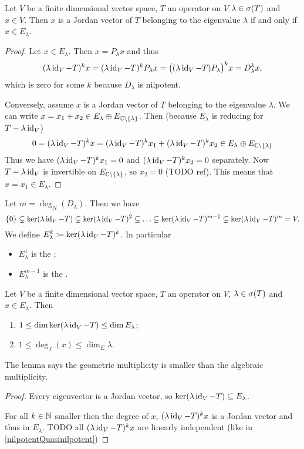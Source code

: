 \begin{proposition}
Let $V$ be a finite dimensional vector space, $T$ an operator on $V$ $\lambda\in\sigma(T)$ and $x\in V$. Then $x$ is a Jordan vector of $T$ belonging to the eigenvalue $\lambda$ \textup{if and only if} $x\in E_\lambda$.
\end{proposition}
\begin{proof}
Let $x\in E_\lambda$. Then $x = P_\lambda x$ and thus
\[ (\lambda\operatorname{id}_V - T)^kx = (\lambda\operatorname{id}_V - T)^kP_\lambda x = \big((\lambda\operatorname{id}_V - T)P_\lambda\big)^k x = D_\lambda^k x, \]
which is zero for some $k$ because $D_\lambda$ is nilpotent.

Conversely, assume $x$ is a Jordan vector of $T$ belonging to the eigenvalue $\lambda$. We can write $x = x_1+x_2 \in E_{\lambda}\oplus E_{\mathbb{C}\setminus\{\lambda\}}$.
Then (because $E_\lambda$ is reducing for $T-\lambda\operatorname{id}_V$)
\[ 0 = (\lambda\operatorname{id}_V - T)^kx = (\lambda\operatorname{id}_V - T)^kx_1 + (\lambda\operatorname{id}_V - T)^kx_2 \in E_{\lambda}\oplus E_{\mathbb{C}\setminus\{\lambda\}} \]
Thus we have $(\lambda\operatorname{id}_V - T)^kx_1 = 0$ and $(\lambda\operatorname{id}_V - T)^kx_2 = 0$ separately.
Now $T-\lambda\operatorname{id}_V$ is invertible on $E_{\mathbb{C}\setminus\{\lambda\}}$, so $x_2 = 0$ (TODO ref). This means that $x = x_1 \in E_\lambda$.
\end{proof}

\begin{definition}
Let $m = \deg_N(D_\lambda)$. Then we have
\[ \{0\} \subsetneq \ker(\lambda\operatorname{id}_V - T) \subsetneq \ker(\lambda\operatorname{id}_V - T)^2 \subsetneq \ldots \subsetneq \ker(\lambda\operatorname{id}_V - T)^{m-1} \subsetneq \ker(\lambda\operatorname{id}_V - T)^m = V. \]
We define $E^k_\lambda \coloneqq \ker(\lambda\operatorname{id}_V - T)^k$. In particular
\begin{itemize}
\item $E^1_\lambda$ is the ;
\item $E^{m-1}_\lambda$ is the .
\end{itemize}
\end{definition}

\begin{lemma}
Let $V$ be a finite dimensional vector space, $T$ an operator on $V$, $\lambda\in\sigma(T)$ and $x\in E_\lambda$. Then
\begin{enumerate}
\item $1 \leq \dim\ker(\lambda\operatorname{id}_V - T) \leq \dim E_\lambda$;
\item $1 \leq \deg_J(x) \leq \dim_E\lambda$.
\end{enumerate}
\end{lemma}
The lemma says the geometric multiplicity is smaller than the algebraic multiplicity.
\begin{proof}
Every eigenvector is a Jordan vector, so $\ker(\lambda\operatorname{id}_V - T) \subseteq E_\lambda$.

For all $k\in\mathbb{N}$ smaller then the degree of $x$, $(\lambda\operatorname{id}_V - T)^kx$ is a Jordan vector and thus in $E_\lambda$. TODO all $(\lambda\operatorname{id}_V - T)^kx$ are linearly independent (like in \ref{nilpotentQuasinilpotent})
\end{proof}


